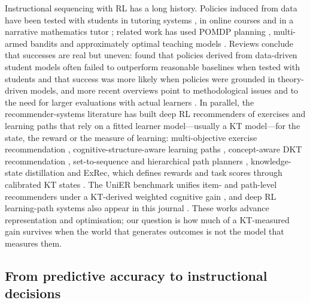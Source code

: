 \documentclass[a4paper,preprint,12pt,authoryear]{elsarticle}
\begin{document}
Instructional sequencing with RL has a long history. Policies induced from data have been tested with students in tutoring systems \citep{chi2011umuai,shen2018jedm,zhou2022hrl}, in online courses \citep{bassen2020chi} and in a narrative mathematics tutor \citep{ruan2024rltutor}; related work has used POMDP planning \citep{rafferty2016pomdp}, multi-armed bandits \citep{clement2015bandits} and approximately optimal teaching models \citep{whitehill2018teaching}. Reviews conclude that successes are real but uneven: \citet{doroudi2019reward} found that policies derived from data-driven student models often failed to outperform reasonable baselines when tested with students and that success was more likely when policies were grounded in theory-driven models, and more recent overviews point to methodological issues and to the need for larger evaluations with actual learners \citep{singla2021rleducation,riedmann2025rlreview}. In parallel, the recommender-systems literature has built deep RL recommenders of exercises and learning paths that rely on a fitted learner model---usually a KT model---for the state, the reward or the measure of learning: multi-objective exercise recommendation \citep{huang2019dre}, cognitive-structure-aware learning paths \citep{liu2019cseal}, concept-aware DKT recommendation \citep{ai2019cdkt}, set-to-sequence and hierarchical path planners \citep{chen2023src,li2023gehrl}, knowledge-state distillation \citep{li2024pksd} and ExRec, which defines rewards and task scores through calibrated KT states \citep{ozyurt2025exrec}. The UniER benchmark unifies item- and path-level recommenders under a KT-derived weighted cognitive gain \citep{cheng2026unier}, and deep RL learning-path systems also appear in this journal \citep{ruan2025adaptive}. These works advance representation and optimisation; our question is how much of a KT-measured gain survives when the world that generates outcomes is not the model that measures them.

\subsection{From predictive accuracy to instructional decisions}
\end{document}
